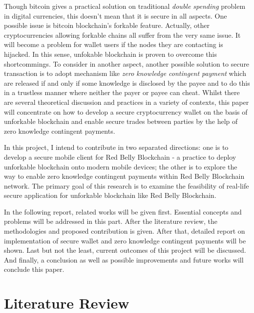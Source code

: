 \documentclass[12pt]{article}
\begin{document}
Though bitcoin gives a practical solution on traditional \textit{double spending} problem in digital currencies, this doesn't mean that it is secure in all aspects. One possible issue is bitcoin blockchain's forkable feature. Actually, other cryptocurrencies allowing forkable chains all suffer from the very same issue. It will become a problem for wallet users if the nodes they are contacting is hijacked. In this sense, unfokable blockchain is proven to overcome this shortcommings\cite{DBLP:journals/corr/CrainGLR17}. To consider in another aspect, another possible solution to secure transaction is to adopt mechanism like \textit{zero knowledge contingent payment} which are released if and only if some knowledge is disclosed by the payee and to do this in a trustless manner where neither the payer or payee can cheat\cite{wiki2011zero}\cite{sasson2014zerocash}. Whilst there are several theoretical discussion and practices in a variety of contexts, this paper will concentrate on how to develop a secure cryptocurrency wallet on the basis of unforkable blockchain and enable secure trades between parties by the help of zero knowledge contingent payments. 

In this project, I intend to contribute in two separated directions: one is to develop a secure mobile client for Red Belly Blockchain - a practice to deploy unforkable blockchain onto modern mobile devices; the other is to explore the way to enable zero knowledge contingent payments within Red Belly Blockchain network. The primary goal of this research is to examine the feasibility of real-life secure application for unforkable blockchain like Red Belly Blockchain.

In the following report, related works will be given first. Essential concepts and problems will be addressed in this part. After the literature review, the methodologies and proposed contribution is given. After that, detailed report on implementation of secure wallet and zero knowledge contingent payments will be shown. Last but not the least, current outcomes of this project will be discussed. And finally, a conclusion as well as possible improvements and future works will conclude this paper.

\section{Literature Review}
\label{sec:Literature Review}
\end{document}
